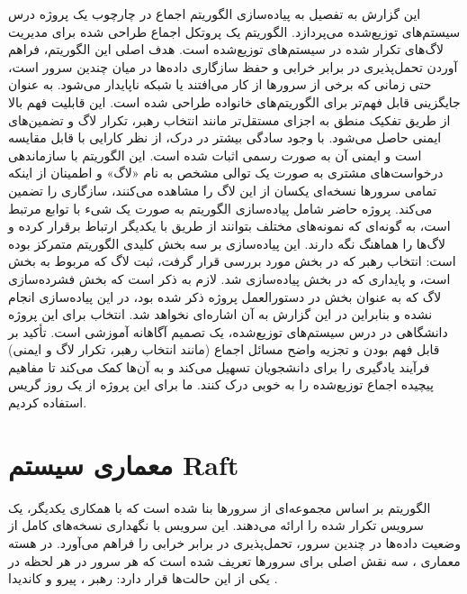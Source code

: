 \documentclass[12pt,a4paper]{article}
\begin{document}
این گزارش به تفصیل به پیاده‌سازی الگوریتم اجماع  در چارچوب یک پروژه 
درس سیستم‌های توزیع‌شده می‌پردازد. الگوریتم  یک پروتکل اجماع طراحی شده برای مدیریت لاگ‌های تکرار شده  در سیستم‌های توزیع‌شده است.
هدف اصلی این الگوریتم، فراهم آوردن تحمل‌پذیری در برابر خرابی  و حفظ سازگاری  داده‌ها در میان چندین سرور است، حتی زمانی که برخی از سرورها از کار می‌افتند یا شبکه ناپایدار می‌شود.
 به عنوان جایگزینی قابل فهم‌تر برای الگوریتم‌های خانواده  طراحی شده است.
این قابلیت فهم بالا از طریق تفکیک منطق به اجزای مستقل‌تر مانند انتخاب رهبر، تکرار لاگ و تضمین‌های ایمنی حاصل می‌شود.
با وجود سادگی بیشتر در درک،  از نظر کارایی با  قابل مقایسه است و ایمنی آن به صورت رسمی اثبات شده است.
این الگوریتم با سازماندهی درخواست‌های مشتری به صورت یک توالی مشخص به نام «لاگ»  و اطمینان از اینکه تمامی سرورها نسخه‌ای یکسان از این لاگ را مشاهده می‌کنند، سازگاری را تضمین می‌کند.
پروژه حاضر شامل پیاده‌سازی الگوریتم  به صورت یک شیء  با توابع مرتبط است، به گونه‌ای که نمونه‌های مختلف  بتوانند از طریق  با یکدیگر ارتباط برقرار کرده و لاگ‌ها را هماهنگ نگه دارند.
این پیاده‌سازی بر سه بخش کلیدی الگوریتم  متمرکز بوده است: انتخاب رهبر  که در بخش  مورد بررسی قرار گرفت، ثبت لاگ  که مربوط به بخش  است، و پایداری  که در بخش  پیاده‌سازی شد.
لازم به ذکر است که بخش فشرده‌سازی لاگ  که به عنوان بخش  در دستورالعمل پروژه ذکر شده بود، در این پیاده‌سازی انجام نشده و بنابراین در این گزارش به آن اشاره‌ای نخواهد شد.
انتخاب  برای این پروژه دانشگاهی در درس سیستم‌های توزیع‌شده، یک تصمیم آگاهانه آموزشی است.
تأکید  بر قابل فهم بودن و تجزیه واضح مسائل اجماع (مانند انتخاب رهبر، تکرار لاگ و ایمنی) فرآیند یادگیری را برای دانشجویان تسهیل می‌کند و به آن‌ها کمک می‌کند تا مفاهیم پیچیده اجماع توزیع‌شده را به خوبی درک کنند. ما برای این پروژه از یک روز گریس استفاده کردیم.

\section{معماری سیستم Raft}

الگوریتم  بر اساس مجموعه‌ای از سرورها بنا شده است که با همکاری یکدیگر، یک سرویس تکرار شده  را ارائه می‌دهند. این سرویس با نگهداری نسخه‌های کامل از وضعیت داده‌ها در چندین سرور، تحمل‌پذیری در برابر خرابی را فراهم می‌آورد. در هسته معماری ، سه نقش اصلی برای سرورها تعریف شده است که هر سرور در هر لحظه در یکی از این حالت‌ها قرار دارد: رهبر ، پیرو  و کاندیدا .
\end{document}
